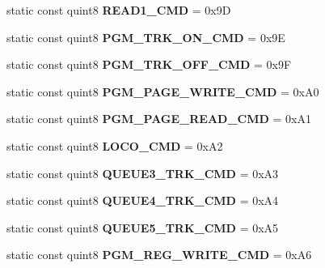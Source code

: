 \begin{DoxyCompactItemize}
\mbox{\label{class_n_c_e_message_a594998390008c1d5c80352855a7f8e56}} 
static const quint8 {\bfseries R\+E\+A\+D1\+\_\+\+C\+MD} = 0x9D
\item 
\mbox{\label{class_n_c_e_message_ad2acc190cdafcb808efa5b2afa1bf8c2}} 
static const quint8 {\bfseries P\+G\+M\+\_\+\+T\+R\+K\+\_\+\+O\+N\+\_\+\+C\+MD} = 0x9E
\item 
\mbox{\label{class_n_c_e_message_a990840e409d105e7fbbd78b7f8a248c9}} 
static const quint8 {\bfseries P\+G\+M\+\_\+\+T\+R\+K\+\_\+\+O\+F\+F\+\_\+\+C\+MD} = 0x9F
\item 
\mbox{\label{class_n_c_e_message_a2f8eaaf76bf8f3d78cbb2938c3dc6ed8}} 
static const quint8 {\bfseries P\+G\+M\+\_\+\+P\+A\+G\+E\+\_\+\+W\+R\+I\+T\+E\+\_\+\+C\+MD} = 0x\+A0
\item 
\mbox{\label{class_n_c_e_message_a80622e5a4f69811d9a5c69e58bbafbe2}} 
static const quint8 {\bfseries P\+G\+M\+\_\+\+P\+A\+G\+E\+\_\+\+R\+E\+A\+D\+\_\+\+C\+MD} = 0x\+A1
\item 
\mbox{\label{class_n_c_e_message_a81400194ed1beabafeeb35d1943c1798}} 
static const quint8 {\bfseries L\+O\+C\+O\+\_\+\+C\+MD} = 0x\+A2
\item 
\mbox{\label{class_n_c_e_message_a9950ee811a7d3230ce6364db2374503f}} 
static const quint8 {\bfseries Q\+U\+E\+U\+E3\+\_\+\+T\+R\+K\+\_\+\+C\+MD} = 0x\+A3
\item 
\mbox{\label{class_n_c_e_message_ae834a6cb12f4fece3af6cbddc7b22839}} 
static const quint8 {\bfseries Q\+U\+E\+U\+E4\+\_\+\+T\+R\+K\+\_\+\+C\+MD} = 0x\+A4
\item 
\mbox{\label{class_n_c_e_message_ad949e543d8fe1d2aeb398933499546f6}} 
static const quint8 {\bfseries Q\+U\+E\+U\+E5\+\_\+\+T\+R\+K\+\_\+\+C\+MD} = 0x\+A5
\item 
\mbox{\label{class_n_c_e_message_a5e4b6bc8e5d3f399ed87d0cf0c744d38}} 
static const quint8 {\bfseries P\+G\+M\+\_\+\+R\+E\+G\+\_\+\+W\+R\+I\+T\+E\+\_\+\+C\+MD} = 0x\+A6

\end{DoxyCompactItemize}
